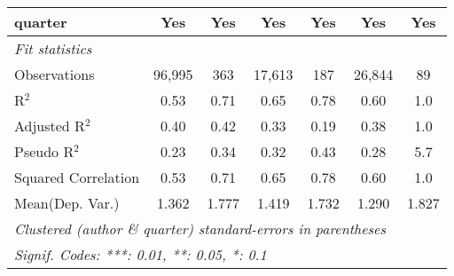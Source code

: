 \begin{tabular}{lcccccc}
   quarter                                                    & Yes           & Yes           & Yes           & Yes         & Yes           & Yes\\  
   \midrule
   \emph{Fit statistics}\\
   Observations                                               & 96,995        & 363           & 17,613        & 187         & 26,844        & 89\\  
   R$^2$                                                      & 0.53          & 0.71          & 0.65          & 0.78        & 0.60          & 1.0\\  
   Adjusted R$^2$                                             & 0.40          & 0.42          & 0.33          & 0.19        & 0.38          & 1.0\\  
   Pseudo R$^2$                                               & 0.23          & 0.34          & 0.32          & 0.43        & 0.28          & 5.7\\  
   Squared Correlation                                        & 0.53          & 0.71          & 0.65          & 0.78        & 0.60          & 1.0\\  
Mean(Dep. Var.) & 1.362 & 1.777 & 1.419 & 1.732 & 1.290 & 1.827 \\
   \midrule \midrule
   \multicolumn{7}{l}{\emph{Clustered (author \& quarter) standard-errors in parentheses}}\\
   \multicolumn{7}{l}{\emph{Signif. Codes: ***: 0.01, **: 0.05, *: 0.1}}\\
\end{tabular}
\par\endgroup
